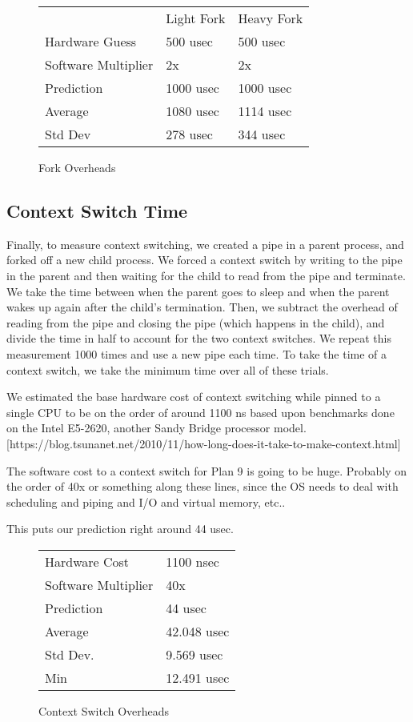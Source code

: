 \documentclass[letterpaper,twocolumn,10pt]{article}
\begin{document}
\begin{figure}
	\centering
\begin{tabular}{lll}
        & Light Fork & Heavy Fork \\
Hardware Guess & 500 usec                 & 500 usec                  \\
Software Multiplier & 2x                 & 2x                  \\
Prediction & 1000 usec                 & 1000 usec                  \\
Average & 1080 usec                 & 1114 usec                  \\
Std Dev & 278 usec                  & 344 usec                  
\end{tabular}
\caption{Fork Overheads}
\label{tab:forkoverheads}
\end{figure}

\subsection{Context Switch Time}

Finally, to measure context switching, we created a pipe in a parent process,
and forked off a new child process. We forced a context switch by writing to
the pipe in the parent and then waiting for the child to read from the pipe
and terminate. We take the time between when the parent goes to sleep and when
the parent wakes up again after the child's termination. Then, we subtract
the overhead of reading from the pipe and closing the pipe (which happens in
the child), and divide the time in half to account for the two context switches.
We repeat this measurement 1000 times and use a new pipe each time. To take
the time of a context switch, we take the minimum time over all of these trials.

We estimated the base hardware cost of context switching while pinned to a single CPU to
be on the order of around 1100 ns based upon benchmarks done on the Intel E5-2620, another
Sandy Bridge processor model. [https://blog.tsunanet.net/2010/11/how-long-does-it-take-to-make-context.html]

The software cost to a context switch for Plan 9 is going to be huge. Probably on the order of 40x or something along these lines, since the OS needs to deal with scheduling and piping and I/O and virtual memory, etc..

This puts our prediction right around 44 usec.

\begin{figure}
	\centering
\begin{tabular}{ll}
Hardware Cost  & 1100 nsec  \\
Software Multiplier  & 40x   \\
Prediction  & 44 usec    \\
Average  & 42.048 usec    \\
Std Dev. & 9.569 usec     \\
Min      & 12.491 usec   
\end{tabular}
\caption{Context Switch Overheads}
\label{tab:conswitchoverheads}
\end{figure}
\end{document}
